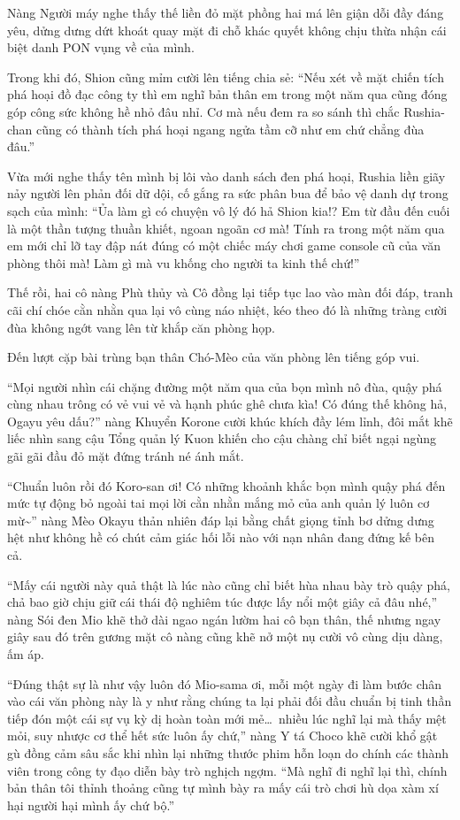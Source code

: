 \documentclass[../main.tex]{subfiles}
\begin{document}
Nàng Người máy nghe thấy thế liền đỏ mặt phồng hai má lên giận dỗi đầy đáng yêu, dửng dưng dứt khoát quay mặt đi chỗ khác quyết không chịu thừa nhận cái biệt danh PON vụng về của mình.

Trong khi đó, Shion cũng mỉm cười lên tiếng chia sẻ: ``Nếu xét về mặt chiến tích phá hoại đồ đạc công ty thì em nghĩ bản thân em trong một năm qua cũng đóng góp công sức không hề nhỏ đâu nhỉ. Cơ mà nếu đem ra so sánh thì chắc Rushia-chan cũng có thành tích phá hoại ngang ngửa tầm cỡ như em chứ chẳng đùa đâu.''

Vừa mới nghe thấy tên mình bị lôi vào danh sách đen phá hoại, Rushia liền giãy nảy người lên phản đối dữ dội, cố gắng ra sức phân bua để bảo vệ danh dự trong sạch của mình: ``Ủa làm gì có chuyện vô lý đó hả Shion kia!? Em từ đầu đến cuối là một thần tượng thuần khiết, ngoan ngoãn cơ mà! Tính ra trong một năm qua em mới chỉ lỡ tay đập nát đúng có một chiếc máy chơi game console cũ của văn phòng thôi mà! Làm gì mà vu khống cho người ta kinh thế chứ!''

Thế rồi, hai cô nàng Phù thủy và Cô đồng lại tiếp tục lao vào màn đối đáp, tranh cãi chí chóe cằn nhằn qua lại vô cùng náo nhiệt, kéo theo đó là những tràng cười đùa không ngớt vang lên từ khắp căn phòng họp.

Đến lượt cặp bài trùng bạn thân Chó-Mèo của văn phòng lên tiếng góp vui.

``Mọi người nhìn cái chặng đường một năm qua của bọn mình nô đùa, quậy phá cùng nhau trông có vẻ vui vẻ và hạnh phúc ghê chưa kìa! Có đúng thế không hả, Ogayu yêu dấu?'' nàng Khuyển Korone cười khúc khích đầy lém lỉnh, đôi mắt khẽ liếc nhìn sang cậu Tổng quản lý Kuon khiến cho cậu chàng chỉ biết ngại ngùng gãi gãi đầu đỏ mặt đứng tránh né ánh mắt.

``Chuẩn luôn rồi đó Koro-san ơi! Có những khoảnh khắc bọn mình quậy phá đến mức tự động bỏ ngoài tai mọi lời cằn nhằn mắng mỏ của anh quản lý luôn cơ mừ\~{}'' nàng Mèo Okayu thản nhiên đáp lại bằng chất giọng tỉnh bơ dửng dưng hệt như không hề có chút cảm giác hối lỗi nào với nạn nhân đang đứng kế bên cả.

``Mấy cái người này quả thật là lúc nào cũng chỉ biết hùa nhau bày trò quậy phá, chả bao giờ chịu giữ cái thái độ nghiêm túc được lấy nổi một giây cả đâu nhé,'' nàng Sói đen Mio khẽ thở dài ngao ngán lườm hai cô bạn thân, thế nhưng ngay giây sau đó trên gương mặt cô nàng cũng khẽ nở một nụ cười vô cùng dịu dàng, ấm áp.

``Đúng thật sự là như vậy luôn đó Mio-sama ơi, mỗi một ngày đi làm bước chân vào cái văn phòng này là y như rằng chúng ta lại phải đối đầu chuẩn bị tinh thần tiếp đón một cái sự vụ kỳ dị hoàn toàn mới mẻ\dots\ nhiều lúc nghĩ lại mà thấy mệt mỏi, suy nhược cơ thể hết sức luôn ấy chứ,'' nàng Y tá Choco khẽ cười khổ gật gù đồng cảm sâu sắc khi nhìn lại những thước phim hỗn loạn do chính các thành viên trong công ty đạo diễn bày trò nghịch ngợm. ``Mà nghĩ đi nghĩ lại thì, chính bản thân tôi thỉnh thoảng cũng tự mình bày ra mấy cái trò chơi hù dọa xàm xí hại người hại mình ấy chứ bộ.''
\end{document}
